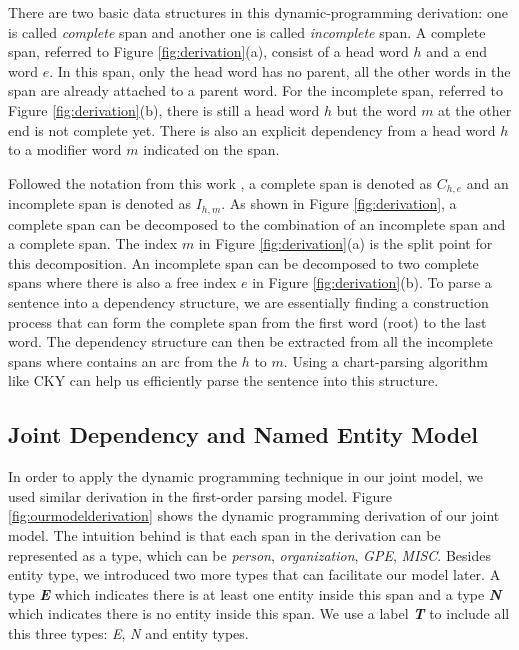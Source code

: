 There are two basic data structures in this dynamic-programming derivation: one is called \textit{complete} span and another one is called \textit{incomplete} span. 
A complete span, referred to Figure \ref{fig:derivation}(a), consist of a head word $h$ and a end word $e$. 
In this span, only the head word has no parent, all the other words in the span are already attached to a parent word.  
For the incomplete span, referred to Figure \ref{fig:derivation}(b), there is still a head word $h$ but the word $m$ at the other end is not complete yet. 
There is also an explicit dependency from a head word $h$ to a modifier word $m$ indicated on the span. 

Followed the notation from this work \cite{koo2010efficient}, a complete span is denoted as $C_{h,e}$ and an incomplete span is denoted as $I_{h,m}$. As shown in Figure \ref{fig:derivation}, a complete span can be decomposed to the combination of an incomplete span and a complete span. The index $m$ in Figure \ref{fig:derivation}(a) is the split point for this decomposition. An incomplete span can be decomposed to two complete spans where there is also a free index $e$ in Figure \ref{fig:derivation}(b). 
To parse a sentence into a dependency structure, we are essentially finding a construction process that can form the complete span from the first word (root) to the last word. 
The dependency structure can then be extracted from all the incomplete spans where contains an arc from the $h$ to $m$.
Using a chart-parsing algorithm like CKY can help us efficiently parse the sentence into this structure. 



\subsection{Joint Dependency and Named Entity Model}
In order to apply the dynamic programming technique in our joint model, we used similar derivation in the first-order parsing model. 
Figure \ref{fig:ourmodelderivation} shows the dynamic programming derivation of our joint model. The intuition behind is that each span in the derivation can be represented as a type, which can be \textit{person}, \textit{organization}, \textit{GPE}, \textit{MISC}. 
Besides entity type, we introduced two more types that can facilitate our model later. A type \textbf{\textit{E}} which indicates there is at least one entity inside this span and a type \textbf{\textit{N}} which indicates there is no entity inside this span. We use a label \textbf{\textit{T}} to include all this three types: \textit{E}, \textit{N} and entity types. 


